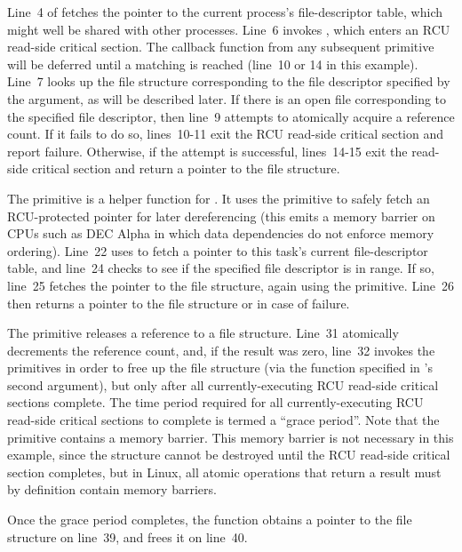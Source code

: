 Line~4 of  fetches the pointer to the current
process's file-descriptor table, which might well be shared
with other processes.
Line~6 invokes , which
enters an RCU read-side critical section.
The callback function from any subsequent  primitive
will be deferred until a matching  is reached
(line~10 or 14 in this example).
Line~7 looks up the file structure corresponding to the file
descriptor specified by the  argument, as will be
described later.
If there is an open file corresponding to the specified file descriptor,
then line~9 attempts to atomically acquire a reference count.
If it fails to do so, lines~10-11 exit the RCU read-side critical
section and report failure.
Otherwise, if the attempt is successful, lines~14-15 exit the read-side
critical section and return a pointer to the file structure.

The  primitive is a helper function for
.
It uses the  primitive to safely fetch an
RCU-protected pointer for later dereferencing (this emits a
memory barrier on CPUs such as DEC Alpha in which data dependencies
do not enforce memory ordering).
Line~22 uses  to fetch a pointer to this
task's current file-descriptor table,
and line~24 checks to see if the specified file descriptor is in range.
If so, line~25 fetches the pointer to the file structure, again using
the  primitive.
Line~26 then returns a pointer to the file structure or 
in case of failure.

The  primitive releases a reference to a file structure.
Line~31 atomically decrements the reference count, and, if the result
was zero, line~32 invokes the  primitives in order to
free up the file structure (via the  function
specified in 's second argument),
but only after all currently-executing
RCU read-side critical sections complete.
The time period required for all currently-executing RCU read-side
critical sections to complete is termed a ``grace period''.
Note that the  primitive contains
a memory barrier.
This memory barrier is not necessary in this example, since the structure
cannot be destroyed until the RCU read-side critical section completes,
but in Linux, all atomic operations that return a result must
by definition contain memory barriers.

Once the grace period completes, the  function
obtains a pointer to the file structure on line~39, and frees it
on line~40.

